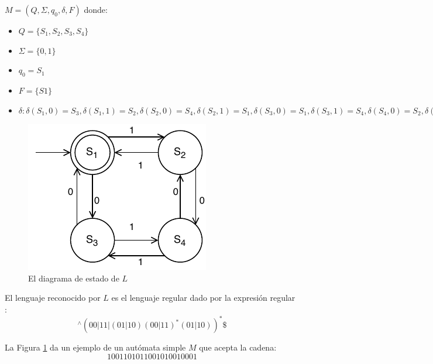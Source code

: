 $M = (Q, \Sigma, q_{0}, \delta, F)$ donde:
\begin{itemize}
	\item $Q = \{S_1, S_2, S_3, S_4 \}$
	\item $\Sigma = \{ 0, 1 \}$
	\item $q_0 = S_1$
	\item $F = \{ S1 \}$
	\item $\delta:  
			\delta(S_1, 0) = S_3, 
			\delta(S_1, 1) = S_2,
			\delta(S_2, 0) = S_4,
			\delta(S_2, 1) = S_1,
			\delta(S_3, 0) = S_1,
			\delta(S_3, 1) = S_4,
			\delta(S_4, 0) = S_2,
			\delta(S_4, 1) = S_3
		$
\end{itemize}

\begin{figure}[H]
	\centering
	\includegraphics[width=0.4\linewidth]{doc/FiniteAutomaton/img/AFD}
	\caption{El diagrama de estado de $L$}
	\label{fig:AFD}
\end{figure}

El lenguaje reconocido por $L$ es el lenguaje regular dado por la expresión regular \cite{stackoverflow:Biegeleisen2015}: 
$$
^\wedge(00|11|(01|10)(00|11)^\ast(01|10))^\ast \$
$$

La Figura \ref{fig:AFD} da un ejemplo de un autómata simple $M$ que acepta la cadena:
$$
1001101011001010010001
$$

